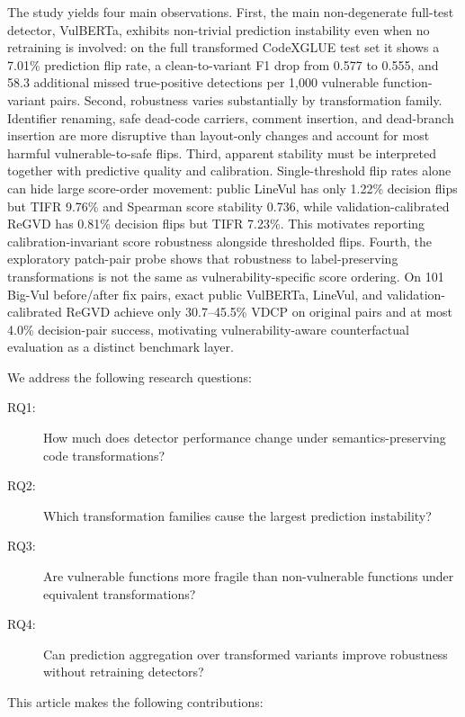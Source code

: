 \documentclass[a4paper,fleqn]{cas-dc}
\begin{document}
The study yields four main observations. First, the main non-degenerate
full-test detector, VulBERTa, exhibits non-trivial prediction instability even
when no retraining is involved: on the full transformed CodeXGLUE test set it
shows a 7.01\% prediction flip rate, a clean-to-variant F1 drop from 0.577 to
0.555, and 58.3 additional missed true-positive detections per 1,000
vulnerable function-variant pairs. Second,
robustness varies substantially by transformation family. Identifier renaming,
safe dead-code carriers, comment insertion, and dead-branch insertion are more
disruptive than layout-only changes and account for most harmful
vulnerable-to-safe flips. Third, apparent stability must be interpreted together with
predictive quality and calibration. Single-threshold flip rates alone can hide
large score-order movement: public LineVul has only 1.22\% decision flips but
TIFR 9.76\% and Spearman score stability 0.736, while validation-calibrated
ReGVD has 0.81\% decision flips but TIFR 7.23\%. This motivates reporting
calibration-invariant score robustness alongside thresholded flips.
Fourth, the exploratory patch-pair probe shows that robustness to
label-preserving transformations is not the same as vulnerability-specific
score ordering. On 101 Big-Vul before/after fix pairs, exact public VulBERTa,
LineVul, and validation-calibrated ReGVD achieve only 30.7--45.5\% VDCP on
original pairs and at most 4.0\% decision-pair success, motivating
vulnerability-aware counterfactual evaluation as a distinct benchmark layer.

We address the following research questions:

\begin{description}
  \item[RQ1:] How much does detector performance change under
  semantics-preserving code transformations?
  \item[RQ2:] Which transformation families cause the largest prediction
  instability?
  \item[RQ3:] Are vulnerable functions more fragile than non-vulnerable
  functions under equivalent transformations?
  \item[RQ4:] Can prediction aggregation over transformed variants improve
  robustness without retraining detectors?
\end{description}

This article makes the following contributions:
\end{document}
